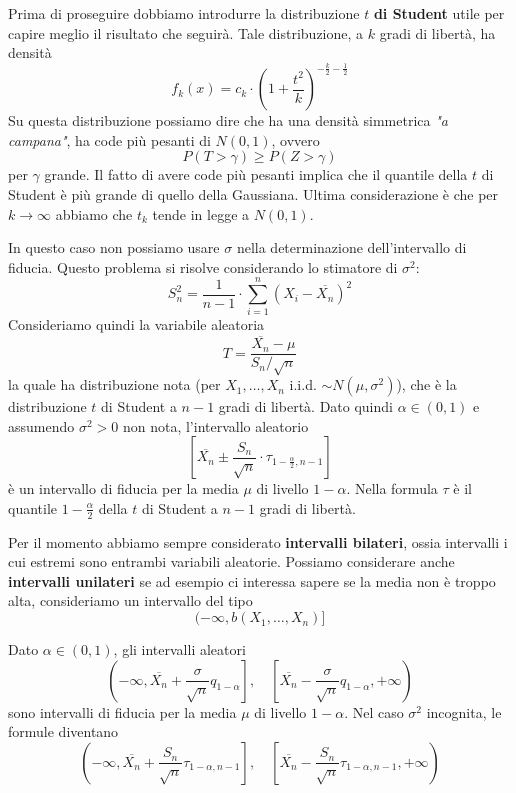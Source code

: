 Prima di proseguire dobbiamo introdurre la distribuzione $t$ \textbf{di Student} utile per capire
meglio il risultato che seguirà. Tale distribuzione, a $k$ gradi di libertà, ha densità
\[
	f_{k} (x) = c_k \cdot
	\left( 1 + \frac{t^2}{k} \right)^{-\frac{k}{2} - \frac{1}{2}}
\]
Su questa distribuzione possiamo dire che ha una densità simmetrica \emph{"a campana"}, ha code
più pesanti di $N(0,1)$, ovvero
\[ P(T > \gamma) \geq P(Z > \gamma) \]
per $\gamma$ grande. Il fatto di avere code più pesanti implica che il quantile della $t$ di
Student è più grande di quello della Gaussiana. Ultima considerazione è che per
$k \to \infty$ abbiamo che $t_k$ tende in legge a $N(0,1)$.

\begin{proposition}
	In questo caso non possiamo usare $\sigma$ nella determinazione dell'intervallo di fiducia.
	Questo problema si risolve considerando lo stimatore di $\sigma^2$:
	\[ S_n^2 = \frac{1}{n-1} \cdot \sum_{i=1}^n \left( X_i - \overline{X_n} \right)^2 \]
	Consideriamo quindi la variabile aleatoria
	\[ T = \frac{\overline{X_n} - \mu}{S_n / \sqrt{n}} \]
	la quale ha distribuzione nota (per $X_1, \dots, X_n$ i.i.d. $\sim N(\mu, \sigma^2)$), che è la
	distribuzione $t$ di Student a $n-1$ gradi di libertà. Dato quindi $\alpha \in (0,1)$ e
	assumendo $\sigma^2 > 0$ non nota, l'intervallo aleatorio
	\[
		\left[ \overline{X_n} \pm
			\frac{S_n}{\sqrt{n}} \cdot \tau_{1 - \frac{\alpha}{2}, n-1} \right]
	\]
	è un intervallo di fiducia per la media $\mu$ di livello $1-\alpha$. Nella formula $\tau$ è il
	quantile $1-\frac{\alpha}{2}$ della $t$ di Student a $n-1$ gradi di libertà.
\end{proposition}

Per il momento abbiamo sempre considerato \textbf{intervalli bilateri}, ossia intervalli i cui
estremi sono entrambi variabili aleatorie. Possiamo considerare anche \textbf{intervalli unilateri}
se ad esempio ci interessa sapere se la media non è troppo alta, consideriamo un intervallo del
tipo
\[ (-\infty, b(X_1, \dots, X_n)] \]

\begin{proposition}
	Dato $\alpha \in (0,1)$, gli intervalli aleatori
	\[
		\left( -\infty, \overline{X_n} + \frac{\sigma}{\sqrt{n}} q_{1-\alpha} \right],
		\quad
		\left[ \overline{X_n} - \frac{\sigma}{\sqrt{n}} q_{1-\alpha}, +\infty \right)
	\]
	sono intervalli di fiducia per la media $\mu$ di livello $1-\alpha$. Nel caso $\sigma^2$
	incognita, le formule diventano
	\[
		\left( -\infty, \overline{X_n} + \frac{S_n}{\sqrt{n}} \tau_{1-\alpha, n-1} \right],
		\quad
		\left[ \overline{X_n} - \frac{S_n}{\sqrt{n}} \tau_{1-\alpha, n-1}, +\infty \right)
	\]
\end{proposition}